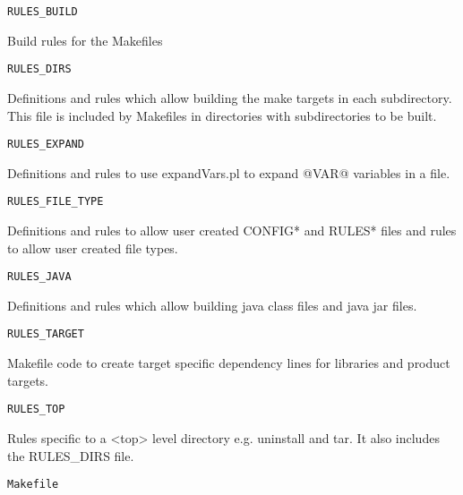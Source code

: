 \begin{description}
\end{description}\begin{verbatim}RULES_BUILD
\end{verbatim}\begin{description}\item Build rules for the Makefiles 

\end{description}\begin{verbatim}RULES_DIRS
\end{verbatim}\begin{description}\item Definitions and rules which allow building the make targets in each subdirectory. This file is included by Makefiles 
in directories with subdirectories to be built.

\end{description}\begin{verbatim}RULES_EXPAND
\end{verbatim}\begin{description}\item Definitions and rules to use expandVars.pl to expand @VAR@ variables in a file.

\end{description}\begin{verbatim}RULES_FILE_TYPE
\end{verbatim}\begin{description}\item Definitions and rules to allow user created CONFIG* and RULES* files and rules to allow user created file types.

\end{description}\begin{verbatim}RULES_JAVA
\end{verbatim}
\begin{description}\item Definitions and rules which allow building java class files and java jar files.

\end{description}\begin{verbatim}RULES_TARGET
\end{verbatim}\begin{description}\item Makefile code to create target specific dependency lines for libraries and product targets.

\end{description}\begin{verbatim}RULES_TOP
\end{verbatim}\begin{description}\item Rules specific to a \textless{}top\textgreater{} level directory e.g. uninstall and tar. It also includes the RULES\_DIRS file.

\end{description}\begin{verbatim}Makefile
\end{verbatim}
